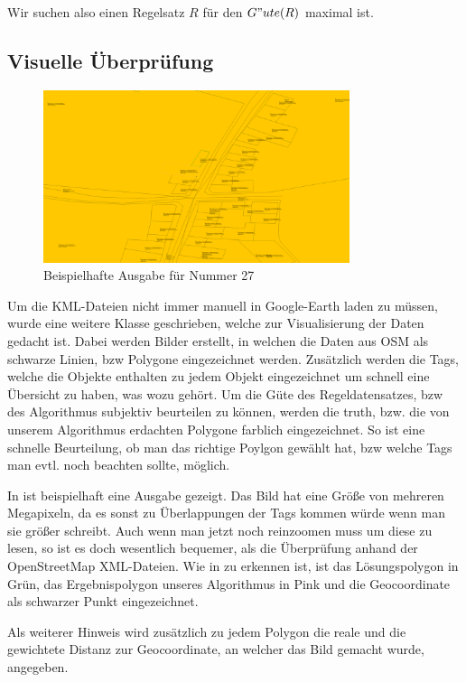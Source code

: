 Wir suchen also einen Regelsatz $R$ für den $G"ute(R)$ maximal ist.


\subsection{Visuelle Überprüfung}
\label{sec:visuelle_ueberpruefung}
\begin{figure}
\centering
\includegraphics[width=0.8\textwidth]{DataDrawer.png}
\caption{Beispielhafte Ausgabe für Nummer 27}
\label{fig:DataDrawerOrginal}
\end{figure}
Um die KML-Dateien nicht immer manuell in Google-Earth laden zu müssen, wurde eine weitere Klasse geschrieben, welche zur Visualisierung der Daten gedacht ist.
Dabei werden Bilder erstellt, in welchen die Daten aus OSM als schwarze Linien, bzw Polygone eingezeichnet werden. Zusätzlich werden die Tags,
welche die Objekte enthalten zu jedem Objekt eingezeichnet um schnell eine Übersicht zu haben, was wozu gehört.
Um die Güte des Regeldatensatzes, bzw des Algorithmus subjektiv beurteilen zu können, werden die truth, bzw. die von unserem Algorithmus erdachten Polygone
farblich eingezeichnet. So ist eine schnelle Beurteilung, ob man das richtige Poylgon gewählt hat, bzw welche Tags man evtl. noch beachten sollte, möglich.

In  ist beispielhaft eine Ausgabe gezeigt. Das Bild hat eine Größe von mehreren Megapixeln, da es sonst zu Überlappungen der Tags kommen
würde wenn man sie größer schreibt. Auch wenn man jetzt noch reinzoomen muss um diese zu lesen, so ist es doch wesentlich bequemer,
als die Überprüfung anhand der OpenStreetMap XML-Dateien. Wie in  zu erkennen ist, ist das Lösungspolygon in Grün,
das Ergebnispolygon unseres Algorithmus in Pink und die Geocoordinate als schwarzer Punkt eingezeichnet.

Als weiterer Hinweis wird zusätzlich zu jedem Polygon die reale und die gewichtete Distanz zur Geocoordinate, an welcher das Bild gemacht wurde, angegeben.

